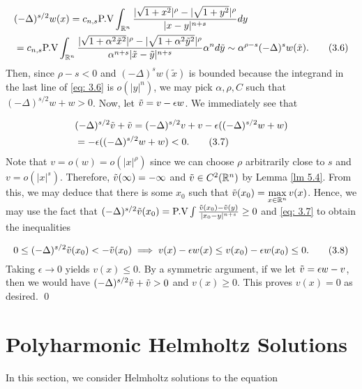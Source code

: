 \documentclass{article}
\begin{document}
\begin{align*}
& (-\Delta)^{s/2}w(x) = c_{n,s} \textrm{P.V}  \int_{\mathbb{R}^n} \frac{ |\sqrt{1+x^2}|^\rho- |\sqrt{1+y^2}|^\rho}{|x-y|^{n+s}}dy \\
&= c_{n,s} \textrm{P.V} \int_{\mathbb{R}^n} \frac{ |\sqrt{1+\alpha^2\tilde{x}^2}|^\rho- |\sqrt{1+\alpha^2 \tilde{y}^2}|^\rho}{\alpha^{n+s}|\tilde{x}-\tilde{y}|^{n+s}} \alpha^n d\tilde{y} \sim \alpha^{\rho-s} (-\Delta)^s w(\tilde{x}).
\tag{3.6} \label{eq: 3.6}
\end{align*}
Then, since $\rho-s<0$ and $(-\Delta)^s w(\tilde{x})$ is bounded because the integrand in the last line of \eqref{eq: 3.6} is $o(|y|^{n})$, we may pick $\alpha, \rho, C$ such that $(-\Delta)^{s/2}w+w>0$. Now, let $\Tilde{v} = v- \epsilon w$. We immediately see that

\begin{align*}
    &(-\Delta)^{s/2}\Tilde{v} + \Tilde{v} = (-\Delta)^{s/2} v + v - \epsilon((-\Delta)^{s/2}w+w) \\
    &= - \epsilon((-\Delta)^{s/2}w+w) < 0.
    \tag{3.7} \label{eq: 3.7}
\end{align*}
Note that $v = o(w)=o(|x|^\rho)$ since we can choose $\rho$ arbitrarily close to $s$ and $v = o(|x|^s)$. Therefore, $\Tilde{v}(\infty) = -\infty$ and $\tilde{v} \in C^2(\mathbb{R}^n)$ by Lemma \ref{lm 5.4}. From this, we may deduce that there is some $x_0$ such that $\tilde{v}(x_0)=\max\limits_{x \in \mathbb{R}^n}v(x)$. Hence, we may use the fact that $(-\Delta)^{s/2} \Tilde{v}(x_0) = \textrm{P.V} \int \frac{\Tilde{v}(x_0) - \Tilde{v}(y)}{|x_0-y|^{n+s}} \ge 0$ and  \eqref{eq: 3.7} to obtain the inequalities

\begin{equation}
    0 \le (-\Delta)^{s/2}\Tilde{v}(x_0) < -\Tilde{v}(x_0) \implies v(x) - \epsilon w(x) \le v(x_0) - \epsilon w(x_0) \le 0.
    \tag{3.8} \label{eq: 3.8}
\end{equation} 
Taking $\epsilon \to 0$ yields $v(x) \le 0$. By a symmetric argument, if we let $\Tilde{v} = \epsilon w - v$, then we would have $(-\Delta)^{s/2}\Tilde{v} + \Tilde{v} > 0$ and $v(x) \ge 0$. This proves $v(x)= 0$ as desired. \qed

\section{Polyharmonic Helmholtz Solutions}

\indent


In this section, we consider Helmholtz solutions to the equation 
\end{document}
